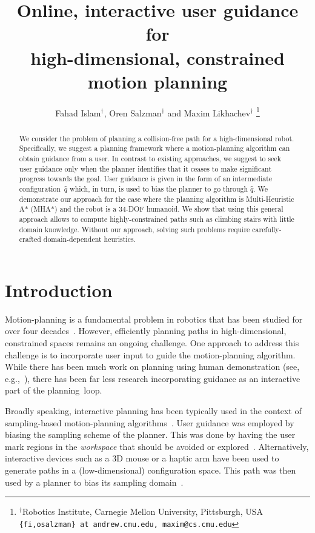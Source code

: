 \documentclass{article}
\title{	Online, interactive user guidance for \\
		high-dimensional, constrained motion planning }
\author{Fahad Islam$^{\dag}$, Oren Salzman$^{\dag}$ and Maxim Likhachev$^{\dag}$%
  \thanks{$^{\dag}$Robotics Institute, Carnegie Mellon University,
    Pittsburgh, USA
    {\tt\small \{fi,osalzman\} at andrew.cmu.edu, maxim@cs.cmu.edu}
  }%
}
\begin{document}
\maketitle
\thispagestyle{empty}
\pagestyle{empty}


\begin{abstract}
We consider the problem of planning a collision-free path for a high-dimensional robot.
Specifically, we suggest a planning framework where a motion-planning algorithm can obtain guidance from a user.
In contrast to existing approaches, we suggest to seek user guidance only when the planner identifies that it ceases to make significant progress towards the goal.
User guidance is given in the form of an intermediate configuration~$\hat{q}$ which, in turn, is used to bias the planner to go through $\hat{q}$.
We demonstrate our approach for the case where the planning algorithm is Multi-Heuristic A* (MHA*) and the robot is a 34-DOF humanoid.
We show that using this general approach allows to compute highly-constrained paths such as climbing stairs with little domain knowledge.
Without our approach, solving such problems require carefully-crafted domain-dependent  heuristics. 
\end{abstract}



\section{Introduction}
\label{sec:intro}

Motion-planning is a fundamental problem in robotics that has been studied for over four decades~\cite{CBHKKLT05,L06,S04}.
However, efficiently planning paths in high-dimensional, constrained spaces remains an ongoing challenge.
One approach to address this challenge is to incorporate user input to guide the motion-planning algorithm.
While there has been much work on planning using human demonstration 
(see, e.g.,~\cite{ACVB09,HS16,PHCL16,SHLA16,YA17}), 
there has been far less research incorporating guidance as an interactive part of the planning~loop.

Broadly speaking, interactive planning has been typically used in the context of sampling-based motion-planning algorithms~\cite{L06}.
User guidance was employed by biasing the sampling scheme of the planner.
This was done by having the user mark regions in the \emph{workspace} that should be avoided or 
explored~\cite{DSJA14,MTMKDC15,YPB15}.
Alternatively, interactive devices such as a 3D mouse or a haptic arm have been used to generate paths in a (low-dimensional) configuration space. This path was then used by a planner to bias its 
sampling domain~\cite{BTFF16,FTF09,TFF12}.
\end{document}
